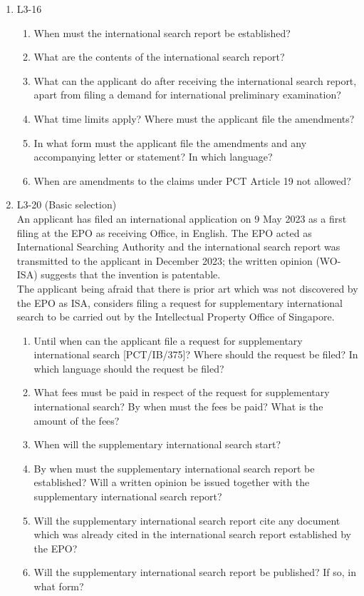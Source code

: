 \documentclass{report}
\begin{document}
\begin{enumerate}[label=\textbf{Question \arabic*}]
    \item %
    L3-16 
    \begin{enumerate}[label=(\alph*)]
        \item When must the international search report be established?
        \item What are the contents of the international search report?
        \item What can the applicant do after receiving the international search report, apart from filing a demand for international preliminary examination?
        \item What time limits apply? Where must the applicant file the amendments?
        \item In what form must the applicant file the amendments and any accompanying letter or statement? In which language?
        \item When are amendments to the claims under PCT Article 19 not allowed?
    \end{enumerate}

    \item %
    L3-20 (Basic selection) \\
    An applicant has filed an international application on 9 May 2023 as a first filing at the EPO as receiving Office, in English. The EPO acted as International Searching Authority and the international search report was transmitted to the applicant in December 2023; the written opinion (WO-ISA) suggests that the invention is patentable. \\
    The applicant being afraid that there is prior art which was not discovered by the EPO as ISA, considers filing a request for supplementary international search to be carried out by the Intellectual Property Office of Singapore.
    \begin{enumerate}[label=(\alph*)]
        \item Until when can the applicant file a request for supplementary international search [PCT/IB/375]? Where should the request be filed? In which language should the request be filed?
        \item What fees must be paid in respect of the request for supplementary international search? By when must the fees be paid? What is the amount of the fees?
        \item When will the supplementary international search start?
        \item By when must the supplementary international search report be established? Will a written opinion be issued together with the supplementary international search report?
        \item Will the supplementary international search report cite any document which was already cited in the international search report established by the EPO?
        \item Will the supplementary international search report be published? If so, in what form?
    \end{enumerate}


\end{enumerate}
\end{document}
